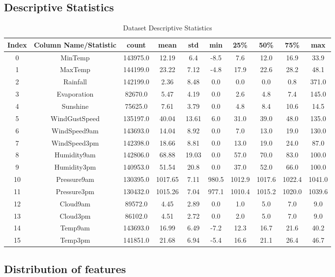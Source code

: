 \documentclass{article}%
\begin{document}
%
\subsection{Descriptive Statistics}%
\label{subsec:DescriptiveStatistics}%


\begin{table}[h!]%
\caption{Dataset Descriptive Statistics}%
\vspace{0.2cm}%
\centering%
\begin{tabular}{|c||c||c||c||c||c||c||c||c||c|}%
\hline%
Index&Column Name/Statistic&count&mean&std&min&25\%&50\%&75\%&max\\%
\hline%
0&MinTemp&143975.0&12.19&6.4&{-}8.5&7.6&12.0&16.9&33.9\\%
1&MaxTemp&144199.0&23.22&7.12&{-}4.8&17.9&22.6&28.2&48.1\\%
2&Rainfall&142199.0&2.36&8.48&0.0&0.0&0.0&0.8&371.0\\%
3&Evaporation&82670.0&5.47&4.19&0.0&2.6&4.8&7.4&145.0\\%
4&Sunshine&75625.0&7.61&3.79&0.0&4.8&8.4&10.6&14.5\\%
5&WindGustSpeed&135197.0&40.04&13.61&6.0&31.0&39.0&48.0&135.0\\%
6&WindSpeed9am&143693.0&14.04&8.92&0.0&7.0&13.0&19.0&130.0\\%
7&WindSpeed3pm&142398.0&18.66&8.81&0.0&13.0&19.0&24.0&87.0\\%
8&Humidity9am&142806.0&68.88&19.03&0.0&57.0&70.0&83.0&100.0\\%
9&Humidity3pm&140953.0&51.54&20.8&0.0&37.0&52.0&66.0&100.0\\%
10&Pressure9am&130395.0&1017.65&7.11&980.5&1012.9&1017.6&1022.4&1041.0\\%
11&Pressure3pm&130432.0&1015.26&7.04&977.1&1010.4&1015.2&1020.0&1039.6\\%
12&Cloud9am&89572.0&4.45&2.89&0.0&1.0&5.0&7.0&9.0\\%
13&Cloud3pm&86102.0&4.51&2.72&0.0&2.0&5.0&7.0&9.0\\%
14&Temp9am&143693.0&16.99&6.49&{-}7.2&12.3&16.7&21.6&40.2\\%
15&Temp3pm&141851.0&21.68&6.94&{-}5.4&16.6&21.1&26.4&46.7\\%
\hline%
\end{tabular}%
\end{table}

%
\newpage%
\subsection{Distribution of features}%
\label{subsec:Distributionoffeatures}%
\end{document}
